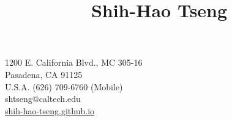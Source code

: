 \title{Shih-Hao Tseng}{
1200 E. California Blvd., MC 305-16\\
Pasadena, CA 91125\\%
U.S.A.
}{
(626) 709-6760 (Mobile)\\
shtseng@caltech.edu\\ %
\href{http://shih-hao-tseng.github.io}{shih-hao-tseng.github.io}%
}
